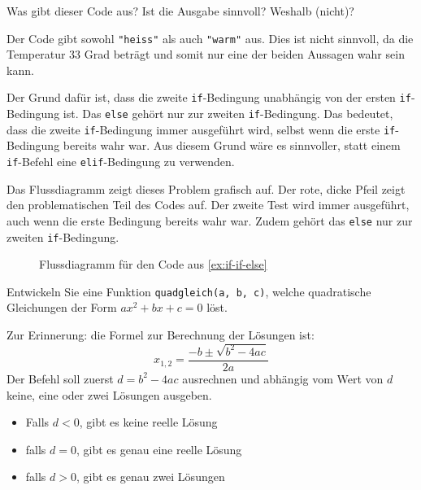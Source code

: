 \begin{myexercise}\label{ex:if-if-else}
	Was gibt dieser Code aus? Ist die Ausgabe sinnvoll? Weshalb (nicht)?
	
	\begin{myanswer}
		Der Code gibt sowohl \lstinline|"heiss"| als auch \lstinline|"warm"| aus. Dies ist nicht sinnvoll, da die Temperatur 33 Grad beträgt und somit nur eine der beiden Aussagen wahr sein kann.

		Der Grund dafür ist, dass die zweite \lstinline|if|-Bedingung unabhängig von der ersten \lstinline|if|-Bedingung ist. Das \lstinline|else| gehört nur zur zweiten \lstinline|if|-Bedingung. Das bedeutet, dass die zweite \lstinline|if|-Bedingung immer ausgeführt wird, selbst wenn die erste \lstinline|if|-Bedingung bereits wahr war. Aus diesem Grund wäre es sinnvoller, statt einem \lstinline|if|-Befehl eine \lstinline|elif|-Bedingung zu verwenden.

		Das Flussdiagramm zeigt dieses Problem grafisch auf. Der rote, dicke Pfeil zeigt den problematischen Teil des Codes auf. Der zweite Test wird immer ausgeführt, auch wenn die erste Bedingung bereits wahr war. Zudem gehört das \lstinline|else| nur zur zweiten \lstinline|if|-Bedingung.

		\begin{figure}[H]
			\centering
			
			\caption{Flussdiagramm für den Code aus \cref{ex:if-if-else}}
			\label{fig:if-if-else}
		\end{figure}
	\end{myanswer}
\end{myexercise}

\begin{myexercise}
	Entwickeln Sie eine Funktion \lstinline|quadgleich(a, b, c)|, welche quadratische Gleichungen der Form \(ax^2 + bx + c = 0\) löst.

	Zur Erinnerung: die Formel zur Berechnung der Lösungen ist:
	\begin{equation}
		x_{1,2} = \frac{-b \pm \sqrt{b^2 - 4ac}}{2a}
	\end{equation}
	Der Befehl soll zuerst \(d = b^2 - 4ac\) ausrechnen und abhängig vom Wert von $d$ keine, eine oder zwei Lösungen ausgeben.
	\begin{itemize}
		\item Falls $d < 0$, gibt es keine reelle Lösung
		\item falls $d = 0$, gibt es genau eine reelle Lösung
		\item falls $d > 0$, gibt es genau zwei Lösungen
	\end{itemize}
	\begin{myanswer}
		
	\end{myanswer}
\end{myexercise}


